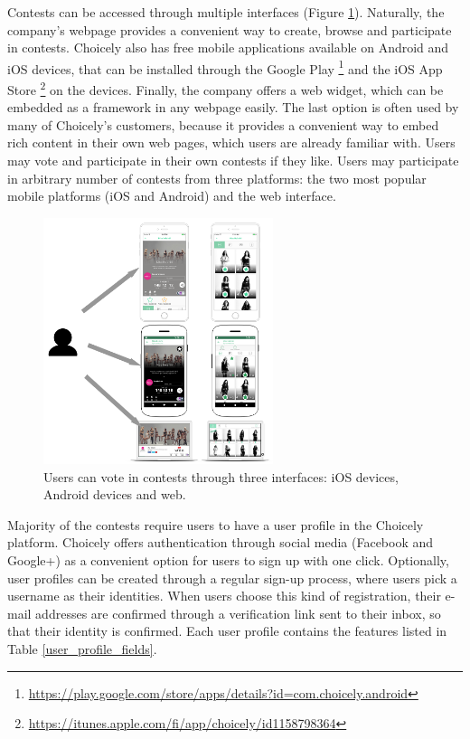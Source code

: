     Contests can be accessed through multiple interfaces (Figure \ref{choicely_platforms}). Naturally, the company's webpage provides a convenient way to create, browse and participate in contests. Choicely also has free mobile applications available on Android and iOS devices, that can be installed through the Google Play \footnote{\url{https://play.google.com/store/apps/details?id=com.choicely.android}} and the iOS App Store \footnote{\url{https://itunes.apple.com/fi/app/choicely/id1158798364}} on the devices. Finally, the company offers a web widget, which can be embedded as a framework in any webpage easily. The last option is often used by many of Choicely's customers, because it provides a convenient way to embed rich content in their own web pages, which users are already familiar with. Users may vote and participate in their own contests if they like. Users may participate in arbitrary number of contests from three platforms: the two most popular mobile platforms (iOS and Android) and the web interface. 
    
    \begin{figure}[h] 
        \begin{center}
            \includegraphics[width=0.6\textwidth]{images/choicely_platforms.png}
            \caption{Users can vote in contests through three interfaces: iOS devices, Android devices and web.}
            \label{choicely_platforms}
        \end{center}
    \end{figure}

    Majority of the contests require users to have a user profile in the Choicely platform. Choicely offers authentication through social media (Facebook and Google+) as a convenient option for users to sign up with one click. Optionally, user profiles can be created through a regular sign-up process, where users pick a username as their identities. When users choose this kind of registration, their e-mail addresses are confirmed through a verification link sent to their inbox, so that their identity is confirmed. Each user profile contains the features listed in Table \ref{user_profile_fields}. 

